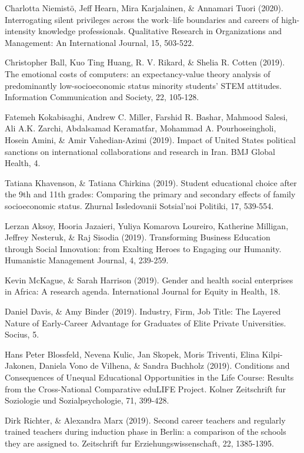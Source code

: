 \documentclass[runningheads]{llncs}
\begin{document}
\begin{multicols}{2}
Charlotta Niemistö, Jeff Hearn, Mira Karjalainen, \& Annamari Tuori (2020). Interrogating silent privileges across the work–life boundaries and careers of high-intensity knowledge professionals. Qualitative Research in Organizations and Management: An International Journal, 15, 503-522.

Christopher Ball, Kuo Ting Huang, R. V. Rikard, \& Shelia R. Cotten (2019). The emotional costs of computers: an expectancy-value theory analysis of predominantly low-socioeconomic status minority students’ STEM attitudes. Information Communication and Society, 22, 105-128.

Fatemeh Kokabisaghi, Andrew C. Miller, Farshid R. Bashar, Mahmood Salesi, Ali A.K. Zarchi, Abdalsamad Keramatfar, Mohammad A. Pourhoseingholi, Hosein Amini, \& Amir Vahedian-Azimi (2019). Impact of United States political sanctions on international collaborations and research in Iran. BMJ Global Health, 4.

Tatiana Khavenson, \& Tatiana Chirkina (2019). Student educational choice after the 9th and 11th grades: Comparing the primary and secondary effects of family socioeconomic status. Zhurnal Issledovanii Sotsial'noi Politiki, 17, 539-554.

Lerzan Aksoy, Hooria Jazaieri, Yuliya Komarova Loureiro, Katherine Milligan, Jeffrey Nesteruk, \& Raj Sisodia (2019). Transforming Business Education through Social Innovation: from Exalting Heroes to Engaging our Humanity. Humanistic Management Journal, 4, 239-259.

Kevin McKague, \& Sarah Harrison (2019). Gender and health social enterprises in Africa: A research agenda. International Journal for Equity in Health, 18.

Daniel Davis, \& Amy Binder (2019). Industry, Firm, Job Title: The Layered Nature of Early-Career Advantage for Graduates of Elite Private Universities. Socius, 5.

Hans Peter Blossfeld, Nevena Kulic, Jan Skopek, Moris Triventi, Elina Kilpi-Jakonen, Daniela Vono de Vilhena, \& Sandra Buchholz (2019). Conditions and Consequences of Unequal Educational Opportunities in the Life Course: Results from the Cross-National Comparative eduLIFE Project. Kolner Zeitschrift fur Soziologie und Sozialpsychologie, 71, 399-428.

Dirk Richter, \& Alexandra Marx (2019). Second career teachers and regularly trained teachers during induction phase in Berlin: a comparison of the schools they are assigned to. Zeitschrift fur Erziehungswissenschaft, 22, 1385-1395.


\end{multicols}
\end{document}
